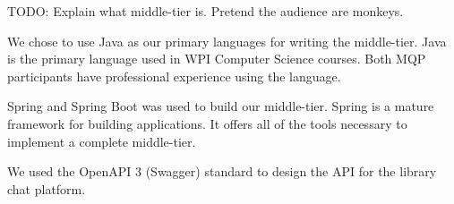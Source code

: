 TODO: Explain what middle-tier is. Pretend the audience are monkeys.


    We chose to use Java as our primary languages for writing the middle-tier.
    Java is the primary language used in WPI Computer Science courses.
    Both MQP participants have professional experience using the language.


    Spring and Spring Boot was used to build our middle-tier.
    Spring is a mature framework for building applications.
    It offers all of the tools necessary to implement a complete middle-tier.


    We used the OpenAPI 3 (Swagger) standard to design the API for the library chat platform.